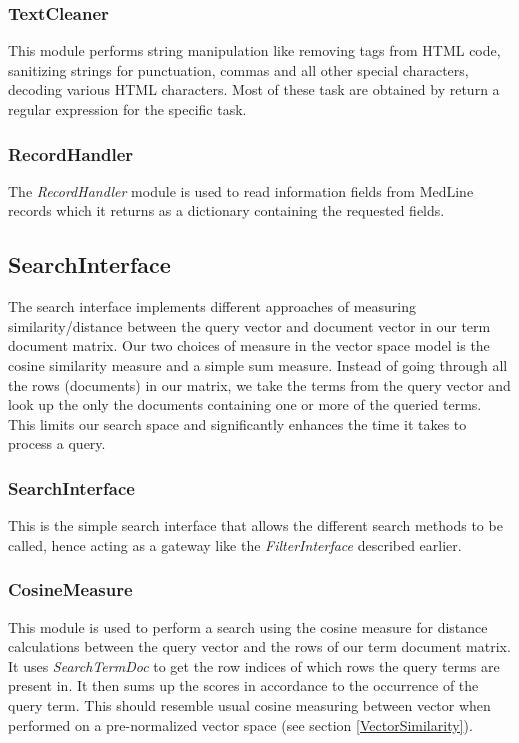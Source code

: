 \subsubsection{TextCleaner}
This module performs string manipulation like removing tags from HTML
code, sanitizing strings for punctuation, commas and all other special
characters, decoding various HTML characters. Most of these task are
obtained by return a regular expression for the specific task.

\subsubsection{RecordHandler}
The \textit{RecordHandler} module is used to read information fields
from MedLine records which it returns as a dictionary containing the
requested fields.

\subsection{SearchInterface}
The search interface implements different approaches of measuring
similarity/distance between the query vector and document vector in
our term document matrix. Our two choices of measure in the vector
space model is the cosine similarity measure and a simple sum
measure. Instead of going through all the rows (documents) in our
matrix, we take the terms from the query vector and look up the only
the documents containing one or more of the queried terms. This limits
our search space and significantly enhances the time it takes to
process a query.

\subsubsection{SearchInterface}
This is the simple search interface that allows the different search
methods to be called, hence acting as a gateway like the
\textit{FilterInterface} described earlier.

\subsubsection{CosineMeasure}
This module is used to perform a search using the cosine measure for
distance calculations between the query vector and the rows of our
term document matrix. It uses \textit{SearchTermDoc} to get the row
indices of which rows the query terms are present in. It then sums up
the scores in accordance to the occurrence of the query term. This
should resemble usual cosine measuring between vector when performed
on a pre-normalized vector space (see section \ref{VectorSimilarity}).

